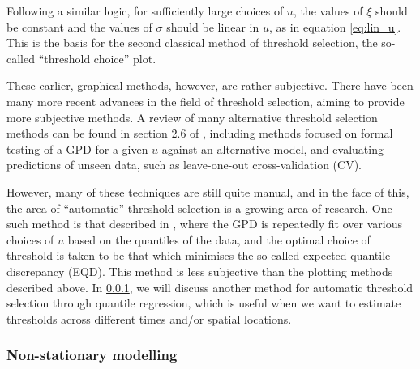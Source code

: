 \documentclass{article}
\numberwithin{equation}{section}
\begin{document}
Following a similar logic, for sufficiently large choices of $u$, the values of $\xi$ should be constant and the values of $\sigma$ should be linear in $u$, as in equation \ref{eq:lin_u}.
This is the basis for the second classical method of threshold selection, the so-called ``threshold choice'' plot.

These earlier, graphical methods, however, are rather subjective.
There have been many more recent advances in the field of threshold selection, aiming to provide more subjective methods. 
A review of many alternative threshold selection methods can be found in section 2.6 of \cite{Belzile2022}, including methods focused on formal testing of a GPD for a given $u$ against an alternative model, and evaluating predictions of unseen data, such as leave-one-out cross-validation (CV). 

However, many of these techniques are still quite manual, and in the face of this, the area of ``automatic'' threshold selection is a growing area of research. 
One such method is that described in \cite{Murphy2024}, where the GPD is repeatedly fit over various choices of $u$ based on the quantiles of the data, and the optimal choice of threshold is taken to be that which minimises the so-called expected quantile discrepancy (EQD).
This method is less subjective than the plotting methods described above.
In \ref{subsubsec:non_stationary}, we will discuss another method for automatic threshold selection through quantile regression, which is useful when we want to estimate thresholds across different times and/or spatial locations.

\subsubsection{Non-stationary modelling} \label{subsubsec:non_stationary}
\end{document}
